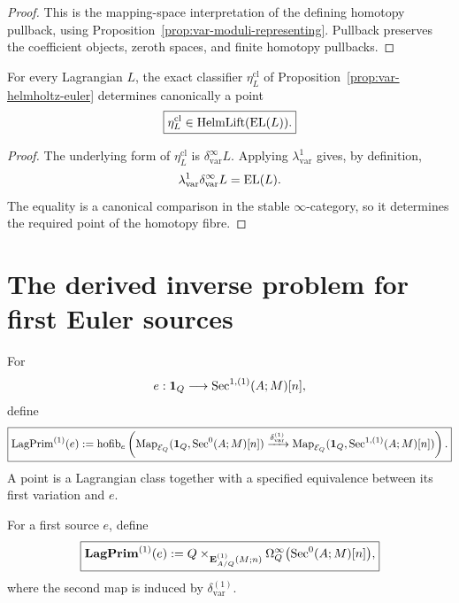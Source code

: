 \begin{proof}
This is the mapping-space interpretation of the defining homotopy pullback, using Proposition~\ref{prop:var-moduli-representing}. Pullback preserves the coefficient objects, zeroth spaces, and finite homotopy pullbacks.
\end{proof}

\begin{theorem}
\label{thm:var-euler-helmholtz-lift}
For every Lagrangian \(L\), the exact classifier \(\eta_L^{\mathrm{cl}}\) of Proposition~\ref{prop:var-helmholtz-euler} determines canonically a point
\[
    \boxed{
    \eta_L^{\mathrm{cl}}
    \in
    \operatorname{HelmLift}(\operatorname{EL}(L)).
    }
\]
\end{theorem}

\begin{proof}
The underlying form of \(\eta_L^{\mathrm{cl}}\) is \(\delta^{\infty}_{\mathrm{var}}L\). Applying \(\lambda^1_{\mathrm{var}}\) gives, by definition,
\[
    \lambda^1_{\mathrm{var}}\delta^{\infty}_{\mathrm{var}}L
    =
    \operatorname{EL}(L).
\]
The equality is a canonical comparison in the stable \(\infty\)-category, so it determines the required point of the homotopy fibre.
\end{proof}

\section{The derived inverse problem for first Euler sources}
\label{sec:var-inverse-problem}

\begin{definition}
\label{def:var-first-lagrangian-primitive}
For
\[
    e:\mathbf 1_Q\longrightarrow\operatorname{Sec}^{1,(1)}(A;M)[n],
\]
define
\[
    \boxed{
    \operatorname{LagPrim}^{(1)}(e)
    :=
    \operatorname{hofib}_e\left(
      \operatorname{Map}_{\mathcal E_Q}(\mathbf 1_Q,\operatorname{Sec}^0(A;M)[n])
      \xrightarrow{\delta^{(1)}_{\mathrm{var}}}
      \operatorname{Map}_{\mathcal E_Q}(\mathbf 1_Q,\operatorname{Sec}^{1,(1)}(A;M)[n])
    \right).
    }
\]
A point is a Lagrangian class together with a specified equivalence between its first variation and \(e\).
\end{definition}

\begin{definition}
\label{def:var-parameterized-first-lagrangian-primitive}
For a first source \(e\), define
\[
    \boxed{
    \mathbf{LagPrim}^{(1)}(e)
    :=
    Q
    \times_{\mathbf E^{(1)}_{A/Q}(M;n)}
    \Omega_Q^\infty\bigl(\operatorname{Sec}^0(A;M)[n]\bigr),
    }
\]
where the second map is induced by \(\delta^{(1)}_{\mathrm{var}}\).
\end{definition}

